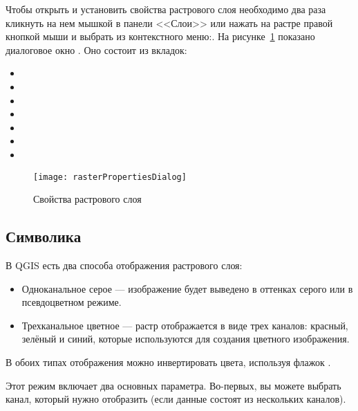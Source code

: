 Чтобы открыть и установить свойства растрового слоя необходимо два раза
кликнуть на нем мышкой в панели <<Слои>> или нажать на растре правой
кнопкой мыши и выбрать  из контекстного
меню:. На рисунке~\ref{fig:raster_properties}
показано диалоговое окно . Оно состоит из
вкладок:

\begin{itemize}[label=--]
 \item {}
 \item {}
 \item {}
 \item {}
 \item {}
 \item {}
 \item {}
\end{itemize}

\begin{figure}[h]
  \centering
   \texttt{[image: rasterPropertiesDialog]}
   \caption{Свойства растрового слоя \nixcaption}\label{fig:raster_properties}
\end{figure}

\subsection{Символика}\label{label_symbology}

В QGIS есть два способа отображения растрового слоя:

\begin{itemize}[label=--]
\item Одноканальное серое --- изображение будет выведено в оттенках серого
или в псевдоцветном режиме. %
\item Трехканальное цветное --- растр отображается в виде трех каналов:
красный, зелёный и синий, которые используются для создания цветного
изображения.
\end{itemize}

В обоих типах отображения можно инвертировать цвета, используя флажок
. %


Этот режим включает два основных параметра. Во-первых, вы можете выбрать канал,
который нужно отобразить (если данные состоят из нескольких каналов).

